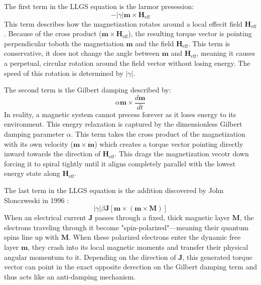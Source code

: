 \documentclass[reprint,amsmath,amssymb,aps, floatfix]{revtex4-2}
\begin{document}
The first term in the LLGS equation is the larmor presession:
\begin{equation}
    -\left|\gamma\right|\mathbf{m} \times \mathbf{H}_{\text{eff}}
\end{equation}
This term describes how the magnetization rotates around a local effecit field $\mathbf{H}_{\text{eff}}$.
Because of the cross product ($\mathbf{m} \times \mathbf{H}_{\text{eff}}$), the resulting torque vector is pointing perpendicular toboth the magnetiation $\mathbf{m}$ and the field $\mathbf{H}_{\text{eff}}$.
This term is conservative, it does not change the angle between  $\mathbf{m}$ and $\mathbf{H}_{\text{eff}}$, meaning it causes a perpetual, circular rotation around the field vector without losing energy.
The speed of this rotation is determined by $\left|\gamma\right|$.

The second term is the Gilbert damping described by:
\begin{equation}
    \alpha \mathbf{m} \times \frac{d\mathbf{m}}{dt}
\end{equation}
In reality, a magnetic system cannot precess forever as it loses energy to its environment.
This enegry relaxation is captured by the dimensionless Gilbert damping parameter $\alpha$.
This term takes the cross product of the magnetization with its own velocity ($\mathbf{m}\times\dot{\mathbf{m}}$) which creates a torque vector pointing directly inward towards the direction of $\mathbf{H}_{\text{eff}}$.
This drags the magnetization vecotr down forcing it to spiral tightly until it aligns completely parallel with the lowest energy state along $\mathbf{H}_{\text{eff}}$.

The last term in the LLGS equation is the addition discovered by John Slonczweski in 1996 \cite{SLONCZEWSKI1996L1}:
\begin{equation}
    \left|\gamma\right|\beta \mathbf{J} \left[ \mathbf{m} \times \left(\mathbf{m}\times\mathbf{M}\right) \right]
\end{equation}
When an electrical current $\mathbf{J}$ passes through a fixed, thick magnetic layer $\mathbf{M}$, the electrons traveling through it become "spin-polarized"—meaning their quantum spins line up with $\mathbf{M}$.
When these polarized electrons enter the dynamic free layer $\mathbf{m}$, they crash into its local magnetic moments and transfer their physical angular momentum to it.
Depending on the direction of $\mathbf{J}$, this generated torque vector can point in the exact opposite derection on the Gilbert damping term and thus acts like an anti-damping mechanism.
\end{document}
